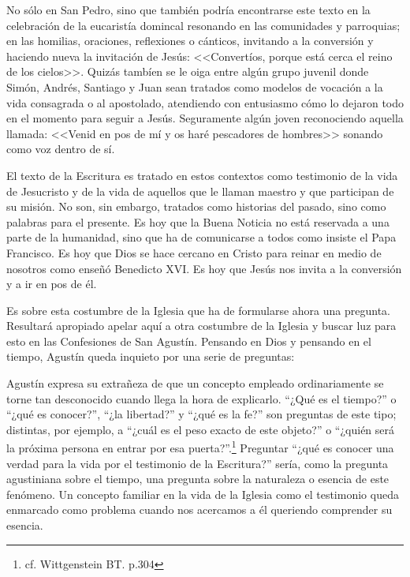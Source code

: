       No sólo en San Pedro, sino que también podría encontrarse este texto en la
      celebración de la eucaristía domincal resonando en las comunidades y parroquias;
      en las homilias, oraciones, reflexiones o cánticos, invitando a la conversión y
      haciendo nueva la invitación de Jesús: <<Convertíos, porque está cerca el reino
      de los cielos>>. Quizás tambíen se le oiga entre algún grupo juvenil donde
      Simón, Andrés, Santiago y Juan sean tratados como modelos de vocación a la vida
      consagrada o al apostolado, atendiendo con entusiasmo cómo lo dejaron todo en el
      momento para seguir a Jesús. Seguramente algún joven reconociendo aquella
      llamada: <<Venid en pos de mí y os haré pescadores de hombres>> sonando como voz
      dentro de sí.

      El texto de la Escritura es tratado en estos contextos como testimonio de la
      vida de Jesucristo y de la vida de aquellos que le llaman maestro y que
      participan de su misión. No son, sin embargo, tratados como historias del
      pasado, sino como palabras para el presente. Es hoy que la Buena Noticia no está
      reservada a una parte de la humanidad, sino que ha de comunicarse a todos como
      insiste el Papa Francisco. Es hoy que Dios se hace cercano en Cristo para reinar
      en medio de nosotros como enseñó Benedicto XVI. Es hoy que Jesús nos invita a la
      conversión y a ir en pos de él.

      Es sobre esta costumbre de la Iglesia que ha de formularse ahora una pregunta.
      Resultará apropiado apelar aquí a otra costumbre de la Iglesia y buscar luz para
      esto en las Confesiones de San Agustín. Pensando en Dios y pensando en el
      tiempo, Agustín queda inquieto por una serie de preguntas: 

      Agustín expresa su extrañeza de que un concepto empleado ordinariamente se
      torne tan desconocido cuando llega la hora de explicarlo. ``¿Qué es el
      tiempo?'' o ``¿qué es conocer?'', ``¿la libertad?'' y ``¿qué es la fe?'' son
      preguntas de este tipo; distintas, por ejemplo, a ``¿cuál es el peso exacto de
      este objeto?'' o ``¿quién será la próxima persona en entrar por esa
      puerta?''.\footnote{cf. Wittgenstein BT. p.304} Preguntar ``¿qué es conocer una
      verdad para la vida por el testimonio de la Escritura?'' sería, como la pregunta
      agustiniana sobre el tiempo, una pregunta sobre la naturaleza o esencia de
      este fenómeno. Un concepto familiar en la vida de la Iglesia como el
      testimonio queda enmarcado como problema cuando nos acercamos a él queriendo
      comprender su esencia.

